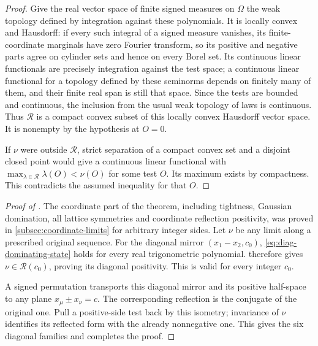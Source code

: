 \begin{proof}
Give the real vector space of finite signed measures on
$\Omega$ the weak topology defined by integration against
these polynomials. It is locally convex and Hausdorff:
if every such integral of a signed measure vanishes, its
finite-coordinate marginals have zero Fourier transform,
so its positive and negative parts agree on cylinder sets
and hence on every Borel set. Its continuous linear
functionals are precisely integration against the test
space; a continuous linear functional for a topology
defined by these seminorms depends on finitely many of
them, and their finite real span is still that space.
Since the tests are bounded and continuous, the inclusion
from the usual weak topology of laws is continuous.
Thus $\mathcal R$ is a compact convex subset of this
locally convex Hausdorff vector space. It is nonempty
by the hypothesis at $O=0$.

If $\nu$ were outside $\mathcal R$, strict separation
\cite[Theorem~6.2.9]{Peterson2017} of
a compact convex set and a disjoint closed point would
give a continuous linear functional with
$\max_{\lambda\in\mathcal R}\lambda(O)<\nu(O)$ for some
test $O$. Its maximum exists by compactness. This contradicts
the assumed inequality for that $O$.
\end{proof}

\begin{proof}[Proof of ]

The coordinate part of the theorem, including tightness, Gaussian
domination, all lattice symmetries and coordinate reflection positivity,
was proved in \cref{subsec:coordinate-limits} for arbitrary integer
sides. Let $\nu$ be any limit along a prescribed original sequence.
For the diagonal mirror $(x_1-x_2,c_0)$,
\eqref{eq:diag-dominating-state} holds for every real
trigonometric polynomial. 
therefore gives $\nu\in\mathcal R(c_0)$, proving its
diagonal positivity. This is valid for every integer
$c_0$.

A signed permutation transports this diagonal mirror
and its positive half-space to any plane
$x_\mu\pm x_\nu=c$. The corresponding reflection is the
conjugate of the original one. Pull a positive-side test
back by this isometry; invariance of $\nu$ identifies
its reflected form with the already nonnegative one.
This gives the six diagonal families and completes
the proof.
\end{proof}

\printbibliography

